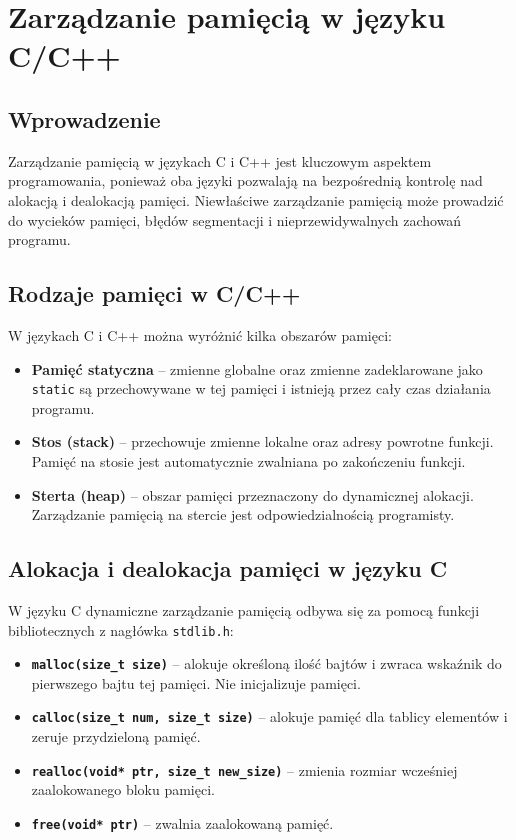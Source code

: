 \section{Zarządzanie pamięcią w języku C/C++}

\subsection{Wprowadzenie}
Zarządzanie pamięcią w językach C i C++ jest kluczowym aspektem programowania, ponieważ oba języki pozwalają na bezpośrednią kontrolę nad alokacją i dealokacją pamięci. Niewłaściwe zarządzanie pamięcią może prowadzić do wycieków pamięci, błędów segmentacji i nieprzewidywalnych zachowań programu.

\subsection{Rodzaje pamięci w C/C++}
W językach C i C++ można wyróżnić kilka obszarów pamięci:

\begin{itemize}
    \item \textbf{Pamięć statyczna} – zmienne globalne oraz zmienne zadeklarowane jako \texttt{static} są przechowywane w tej pamięci i istnieją przez cały czas działania programu.
    \item \textbf{Stos (stack)} – przechowuje zmienne lokalne oraz adresy powrotne funkcji. Pamięć na stosie jest automatycznie zwalniana po zakończeniu funkcji.
    \item \textbf{Sterta (heap)} – obszar pamięci przeznaczony do dynamicznej alokacji. Zarządzanie pamięcią na stercie jest odpowiedzialnością programisty.
\end{itemize}

\subsection{Alokacja i dealokacja pamięci w języku C}
W języku C dynamiczne zarządzanie pamięcią odbywa się za pomocą funkcji bibliotecznych z nagłówka \texttt{stdlib.h}:

\begin{itemize}
    \item \textbf{\texttt{malloc(size\_t size)}} – alokuje określoną ilość bajtów i zwraca wskaźnik do pierwszego bajtu tej pamięci. Nie inicjalizuje pamięci.
    \item \textbf{\texttt{calloc(size\_t num, size\_t size)}} – alokuje pamięć dla tablicy elementów i zeruje przydzieloną pamięć.
    \item \textbf{\texttt{realloc(void* ptr, size\_t new\_size)}} – zmienia rozmiar wcześniej zaalokowanego bloku pamięci.
    \item \textbf{\texttt{free(void* ptr)}} – zwalnia zaalokowaną pamięć.
\end{itemize}

